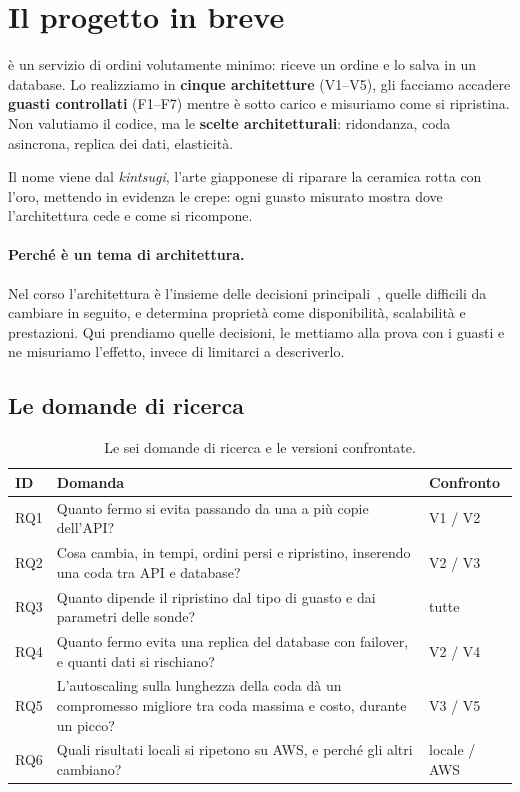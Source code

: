 \section{Il progetto in breve}
\label{s:progetto}

\progetto{} è un servizio di ordini volutamente minimo: riceve un ordine e lo salva in un database. Lo realizziamo in \textbf{cinque architetture} (V1--V5), gli facciamo accadere \textbf{guasti controllati} (F1--F7) mentre è sotto carico e misuriamo come si ripristina. Non valutiamo il codice, ma le \textbf{scelte architetturali}: ridondanza, coda asincrona, replica dei dati, elasticità.

Il nome viene dal \textit{kintsugi}, l'arte giapponese di riparare la ceramica rotta con l'oro, mettendo in evidenza le crepe: ogni guasto misurato mostra dove l'architettura cede e come si ricompone.

\paragraph{Perché è un tema di architettura.} Nel corso l'architettura è l'insieme delle decisioni principali~\cite{dimartino-architetture}, quelle difficili da cambiare in seguito, e determina proprietà come disponibilità, scalabilità e prestazioni. Qui prendiamo quelle decisioni, le mettiamo alla prova con i guasti e ne misuriamo l'effetto, invece di limitarci a descriverlo.

\subsection{Le domande di ricerca}

\begin{table}[H]
\centering
\caption{Le sei domande di ricerca e le versioni confrontate.}
\label{tab:rq}
\begin{tabularx}{\linewidth}{@{}lLl@{}}
\toprule
\textbf{ID} & \textbf{Domanda} & \textbf{Confronto} \\
\midrule
RQ1 & Quanto fermo si evita passando da una a più copie dell'API? & V1 / V2 \\
RQ2 & Cosa cambia, in tempi, ordini persi e ripristino, inserendo una coda tra API e database? & V2 / V3 \\
RQ3 & Quanto dipende il ripristino dal tipo di guasto e dai parametri delle sonde? & tutte \\
RQ4 & Quanto fermo evita una replica del database con failover, e quanti dati si rischiano? & V2 / V4 \\
RQ5 & L'autoscaling sulla lunghezza della coda dà un compromesso migliore tra coda massima e costo, durante un picco? & V3 / V5 \\
RQ6 & Quali risultati locali si ripetono su AWS, e perché gli altri cambiano? & locale / AWS \\
\bottomrule
\end{tabularx}
\end{table}

